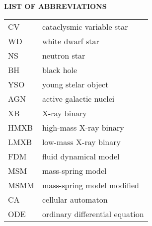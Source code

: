 \newpage
{}
{}
\noindent \Large \textbf{LIST OF ABBREVIATIONS}
\normalsize

\vspace{1cm}

\begin{center}
\def\arraystretch{1.5}%
\setlength\tabcolsep{1cm}
\begin{tabular}{ll}
    CV			& cataclysmic variable star \\
    WD			& white dwarf star \\
    NS          & neutron star \\
    BH          & black hole \\
    YSO         & young stelar object \\
    AGN         & active galactic nuclei \\
    XB          & X-ray binary \\
    HMXB        & high-mass X-ray binary \\
    LMXB        & low-mass X-ray binary \\
    FDM			& fluid dynamical model \\
    MSM			& mass-spring model \\
    MSMM		& mass-spring model modified \\
    CA			& cellular automaton \\
    ODE			& ordinary differential equation
\end{tabular}
\end{center}
